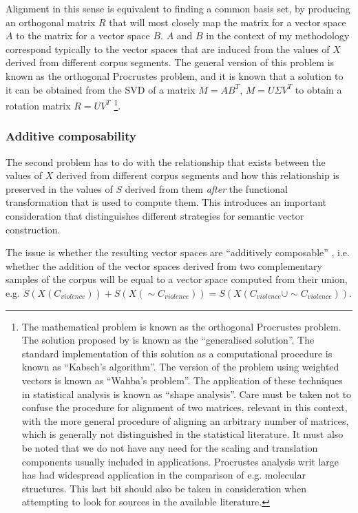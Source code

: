 Alignment in this sense is equivalent to finding a common basis set, by producing an orthogonal matrix $R$ that will most closely map the matrix for a vector space $A$ to the matrix for a vector space $B$.
$A$ and $B$ in the context of my methodology correspond typically to the vector spaces that are induced from the values of $X$ derived from different corpus segments.
The general version of this problem is known as the orthogonal Procrustes problem, and it is known that a solution to it can be obtained from the SVD of a matrix $M = A B^T$, $M = U \Sigma V^T$ to obtain a rotation matrix $R = U V^T$ \citep{schonemann1966}\footnote{
    The mathematical problem is known as the orthogonal Procrustes problem.
    The solution proposed by \citeauthor{schonemann1966} is known as the ``generalised solution''.
    The standard implementation of this solution as a computational procedure is known as ``Kabsch's algorithm''.
    The version of the problem using weighted vectors is known as ``Wahba's problem''.
    The application of these techniques in statistical analysis is known as ``shape analysis''.
    Care must be taken not to confuse the procedure for alignment of two matrices, relevant in this context, with the more general procedure of aligning an arbitrary number of matrices, which is generally not distinguished in the statistical literature.
    It must also be noted that we do not have any need for the scaling and translation components usually included in applications.
    Procrustes analysis writ large has had widespread application in the comparison of e.g. molecular structures.
    This last bit should also be taken in consideration when attempting to look for sources in the available literature.
}.

\subsubsection{Additive composability}

The second problem has to do with the relationship that exists between the values of $X$ derived from different corpus segments and how this relationship is preserved in the values of $S$ derived from them \emph{after} the functional transformation that is used to compute them.
This introduces an important consideration that distinguishes different strategies for semantic vector construction.

The issue is whether the resulting vector spaces are ``additively composable'' \citep{shorrocks1980}, i.e. whether the addition of the vector spaces derived from two complementary samples of the corpus will be equal to a vector space computed from their union, e.g. $S( X(C_{violence}) ) + S( X(\sim C_{violence}) ) = S( X(C_{violence} \cup \sim C_{violence}) )$.

